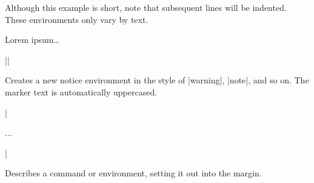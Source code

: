 \documentclass{ltxguidex}
\begin{document}
\begin{example}
	Although this example is short, note that subsequent lines will
	be indented. These environments only vary by text.

\begin{LTXexample}
\begin{warning}
    Lorem ipsum\dots
\end{warning}
\end{LTXexample}
\end{example}

\begin{desc}
||
\end{desc}

Creates a new notice environment in the style of |warning|, |note|, and so
on. The marker text is automatically uppercased.

\begin{desc}
|\begin{desc}...\end{desc}|
\end{desc}

Describes a command or environment, setting it out into the margin.
\end{document}
